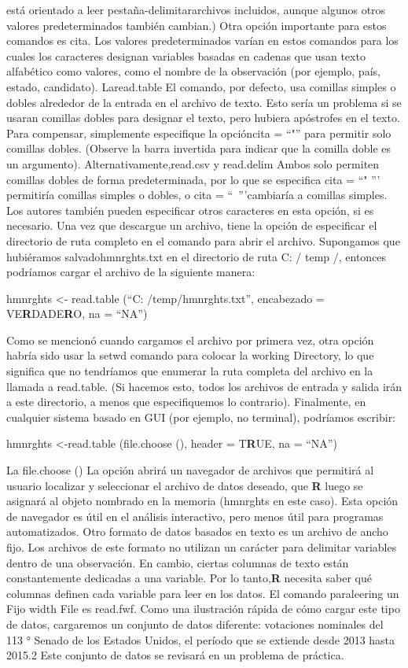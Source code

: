 \documentclass[
]{book}
\begin{document}
está orientado a leer pestaña-delimitararchivos incluidos, aunque algunos otros valores predeterminados también cambian.) Otra opción importante para estos comandos es cita. Los valores predeterminados varían en estos comandos para los cuales los caracteres designan variables basadas en cadenas que usan texto alfabético como valores, como el nombre de la observación (por ejemplo, país, estado, candidato). Laread.table El comando, por defecto, usa comillas simples o dobles alrededor de la entrada en el archivo de texto. Esto sería un problema si se usaran comillas dobles para designar el texto, pero hubiera apóstrofes en el texto. Para compensar, simplemente especifique la opcióncita = ``"'' para permitir solo comillas dobles. (Observe la barra invertida para indicar que la comilla doble es un argumento). Alternativamente,read.csv y read.delim Ambos solo permiten comillas dobles de forma predeterminada, por lo que se especifica cita = ``" ''' permitiría comillas simples o dobles, o cita = ``~'''cambiaría a comillas simples. Los autores también pueden especificar otros caracteres en esta opción, si es necesario.
Una vez que descargue un archivo, tiene la opción de especificar el directorio de ruta completo en el comando para abrir el archivo. Supongamos que hubiéramos salvadohmnrghts.txt
en el directorio de ruta C: / temp /, entonces podríamos cargar el archivo de la siguiente manera:

hmnrghts \textless- read.table (``C: /temp/hmnrghts.txt'',
encabezado = VE\textbf{R}DADE\textbf{R}O, na = ``NA'')

Como se mencionó cuando cargamos el archivo por primera vez, otra opción habría sido usar la setwd comando para colocar la working Directory, lo que significa que no tendríamos que enumerar la ruta completa del archivo en la llamada a read.table. (Si hacemos esto, todos los archivos de entrada y salida irán a este directorio, a menos que especifiquemos lo contrario).
Finalmente, en cualquier sistema basado en GUI (por ejemplo, no terminal), podríamos escribir:

hmnrghts \textless-read.table (file.choose (), header = T\textbf{R}UE, na = ``NA'')

La file.choose () La opción abrirá un navegador de archivos que permitirá al usuario localizar y seleccionar el archivo de datos deseado, que \textbf{R} luego se asignará al objeto nombrado en la memoria (hmnrghts en este caso). Esta opción de navegador es útil en el análisis interactivo, pero menos útil para programas automatizados.
Otro formato de datos basados en texto es un archivo de ancho fijo. Los archivos de este formato no utilizan un carácter para delimitar variables dentro de una observación. En cambio, ciertas columnas de texto están constantemente dedicadas a una variable. Por lo tanto,\textbf{R} necesita saber qué columnas definen cada variable para leer en los datos. El comando paraleering un Fijo width File es read.fwf. Como una ilustración rápida de cómo cargar este tipo de datos, cargaremos un conjunto de datos diferente: votaciones nominales del 113 ° Senado de los Estados Unidos, el período que se extiende desde 2013 hasta 2015.2 Este conjunto de datos se revisará en un problema de práctica.
\end{document}
